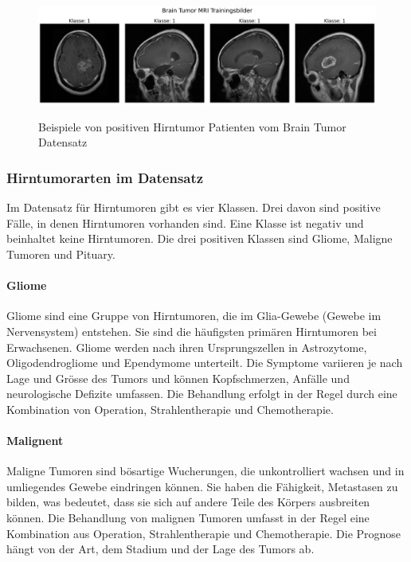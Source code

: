 \begin{figure}[ht]
    \centering
    \includegraphics[width=\linewidth, height=4cm]{01-images/03-data/brain-klasse1.png}
    \caption{Beispiele von positiven Hirntumor Patienten vom Brain Tumor Datensatz}
    \label{fig:brain-klasse1}
\end{figure}

\newpage

\subsubsection{Hirntumorarten im Datensatz}
Im Datensatz für Hirntumoren gibt es vier Klassen. Drei davon sind positive Fälle, in denen Hirntumoren vorhanden sind. Eine Klasse ist negativ und beinhaltet keine Hirntumoren. Die drei positiven Klassen sind Gliome, Maligne Tumoren und Pituary.


\paragraph{Gliome}
Gliome sind eine Gruppe von Hirntumoren, die im Glia-Gewebe (Gewebe im Nervensystem) entstehen. Sie sind die häufigsten primären Hirntumoren bei Erwachsenen. Gliome werden nach ihren Ursprungszellen in Astrozytome, Oligodendrogliome und Ependymome unterteilt. Die Symptome variieren je nach Lage und Grösse des Tumors und können Kopfschmerzen, Anfälle und neurologische Defizite umfassen. Die Behandlung erfolgt in der Regel durch eine Kombination von Operation, Strahlentherapie und Chemotherapie.

\paragraph{Malignent}
Maligne Tumoren sind bösartige Wucherungen, die unkontrolliert wachsen und in umliegendes Gewebe eindringen können. Sie haben die Fähigkeit, Metastasen zu bilden, was bedeutet, dass sie sich auf andere Teile des Körpers ausbreiten können. Die Behandlung von malignen Tumoren umfasst in der Regel eine Kombination aus Operation, Strahlentherapie und Chemotherapie. Die Prognose hängt von der Art, dem Stadium und der Lage des Tumors ab.

